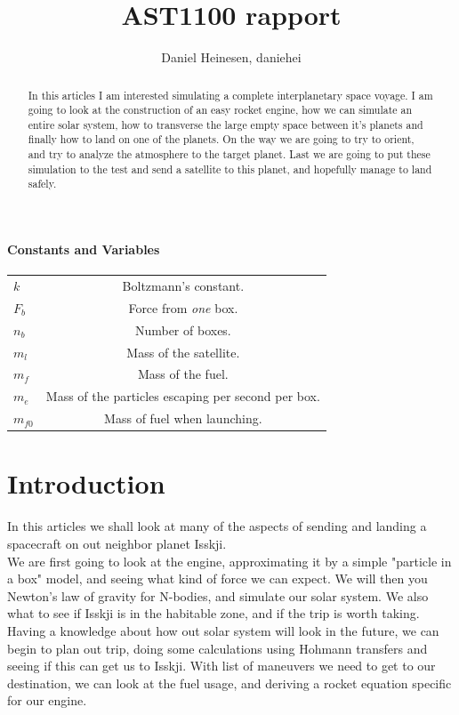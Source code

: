 \documentclass[a4paper, 10pt]{article}
\title{AST1100 rapport}
\author{Daniel Heinesen, daniehei}
\begin{document}
\maketitle

\begin{abstract}
In this articles I am interested simulating a complete interplanetary space voyage. I am going to look at the construction of an easy rocket engine, how we can simulate an entire solar system, how to transverse the large empty space between it's planets and finally how to land on one of the planets. On the way we are going to try to orient, and try to analyze the atmosphere to the target planet. Last we are going to put these simulation to the test and send a satellite to this planet, and hopefully manage to land safely.
\end{abstract} 

\paragraph*{Constants and Variables}

\begin{center}
\begin{tabular}{l  c}
$k$ & Boltzmann's constant.\\
$F_b$ & Force from \textit{one} box. \\
$n_b$ & Number of boxes.\\
$m_l$ & Mass of the satellite. \\
$m_f$ & Mass of the fuel.\\
$m_e$ & Mass of the particles escaping per second per box. \\
$m_{f0}$ & Mass of fuel when launching. \\
\end{tabular}
\end{center}



\tableofcontents

\section{Introduction}

In this articles we shall look at many of the aspects of sending and landing a spacecraft on out neighbor planet Isskji. \\

We are first going to look at the engine, approximating it by a simple "particle in a box" model, and seeing what kind of force we can expect. We will then you Newton's law of gravity for N-bodies, and simulate our solar system. We also what to see if Isskji is in the habitable zone, and if the trip is worth taking. Having a knowledge about how out solar system will look in the future, we can begin to plan out trip, doing some calculations using Hohmann transfers and seeing if this can get us to Isskji. With list of maneuvers we need to get to our destination, we can look at the fuel usage, and deriving a rocket equation specific for our engine. \\
\end{document}
